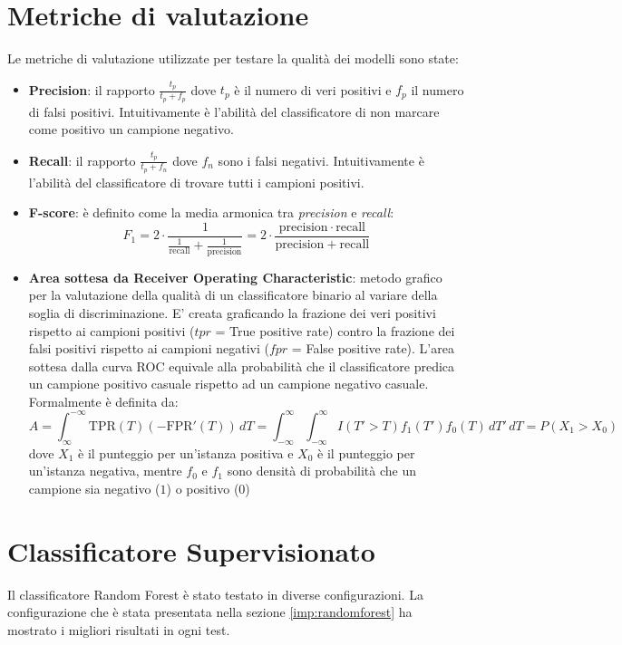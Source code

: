 \section{Metriche di valutazione}
\label{metriche}
Le metriche di valutazione utilizzate per testare la qualità dei modelli sono state:
\begin{itemize}
\item \textbf{Precision}: il rapporto $\frac{t_p}{t_p+f_p}$ dove $t_p$ è il numero di veri positivi e $f_p$ il numero di falsi positivi. Intuitivamente è l'abilità del classificatore di non marcare come positivo un campione negativo.
\item \textbf{Recall}: il rapporto $\frac{t_p}{t_p+f_n}$  dove $f_n$ sono i falsi negativi. Intuitivamente è l'abilità del classificatore di trovare tutti i campioni positivi.
\item \textbf{F-score}: è definito come la media armonica tra \textit{precision} e \textit{recall}: 
\[F_1 = 2 \cdot \frac{1}{\tfrac{1}{\mathrm{recall}} + \tfrac{1}{\mathrm{precision}}} = 2 \cdot \frac{\mathrm{precision} \cdot \mathrm{recall}}{\mathrm{precision} + \mathrm{recall}}\]
\item \textbf{Area sottesa da Receiver Operating Characteristic}:  metodo grafico per la valutazione della qualità di un classificatore binario al variare della soglia di discriminazione. E' creata graficando la frazione dei veri positivi rispetto ai campioni positivi ($tpr$ = True positive rate) contro la frazione dei falsi positivi rispetto ai campioni negativi ($fpr$ = False positive rate). L'area sottesa dalla curva ROC equivale alla probabilità che il classificatore predica un campione positivo casuale rispetto ad un campione negativo casuale. Formalmente è definita da:
\[ A = \int_{\infty}^{-\infty} \mbox{TPR}(T) \left(-\mbox{FPR}'(T)\right) \, dT = \int_{-\infty}^{\infty} \int_{-\infty}^{\infty} I(T'>T)f_1(T') f_0(T) \, dT' \, dT = P(X_1 > X_0)\]
dove 
$X_{1}$ è il punteggio per un'istanza positiva e $X_{0}$ è il punteggio per un'istanza negativa, mentre $f_{0}$ e $f_{1}$ sono densità di probabilità che un campione sia negativo ($1$) o positivo ($0$)
\end{itemize}

\newpage
\section{Classificatore Supervisionato}
\label{res:crf}
Il classificatore Random Forest è stato testato in diverse configurazioni. La configurazione che è stata presentata nella sezione \ref{imp:randomforest} ha mostrato i migliori risultati in ogni test.

